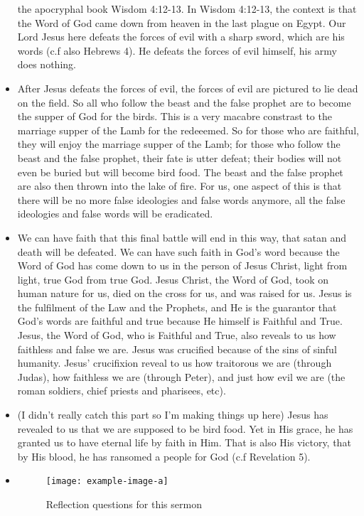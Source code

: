 \begin{itemize}
{  the apocryphal book Wisdom 4:12-13.  In Wisdom 4:12-13, the context is that
  the Word of God came down from heaven in the last plague on Egypt.  Our
  Lord Jesus here defeats the forces of evil with a sharp sword, which are
  his words (c.f also Hebrews 4).  He defeats the forces of evil himself, his
  army does nothing.  }
  \item{After Jesus defeats the forces of evil, the forces of evil are
  pictured to lie dead on the field.  So all who follow the beast and the
  false prophet are to become the supper of God for the birds.  This is a
  very macabre constrast to the marriage supper of the Lamb for the
  redeeemed.  So for those who are faithful, they will enjoy the marriage
  supper of the Lamb; for those who follow the beast and the false prophet,
  their fate is utter defeat; their bodies will not even be buried but will
  become bird food.  The beast and the false prophet are also then thrown
  into the lake of fire.  For us, one aspect of this is that there will be no
  more false ideologies and false words anymore, all the false ideologies and
  false words will be eradicated.}
  \item{We can have faith that this final battle will end in this way, that
  satan and death will be defeated.  We can have such faith in God's word
  because the Word of God has come down to us in the person of Jesus Christ,
  light from light, true God from true God.  Jesus Christ, the Word of God,
  took on human nature for us, died on the cross for us, and was raised for
  us.  Jesus is the fulfilment of the Law and the Prophets, and He is the
  guarantor that God's words are faithful and true because He himself is
  Faithful and True.  Jesus, the Word of God, who is Faithful and True, also
  reveals to us how faithless and false we are.  Jesus was crucified because
  of the sins of sinful humanity.  Jesus' crucifixion reveal to us how
  traitorous we are (through Judas), how faithless we are (through Peter),
  and just how evil we are (the roman soldiers, chief priests and pharisees,
  etc). }
  \item{(I didn't really catch this part so I'm making things up here) Jesus
  has revealed to us that we are supposed to be bird food.  Yet in His grace,
  he has granted us to have eternal life by faith in Him.  That is also His
  victory, that by His blood, he has ransomed a people for God (c.f
  Revelation 5).  }
  \item{\begin{figure}[H]
    \centering
    \texttt{[image: example-image-a]}
    \caption[]{Reflection questions for this sermon}
    \label{}
  \end{figure}}
\end{itemize}